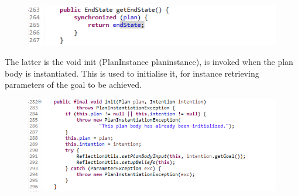 \documentclass{article}
\begin{document}

\begin{figure}[!ht]
	\centering
	\includegraphics[width=\linewidth]{GetEndState}
	\label{Rotulo}
\end{figure}

The latter is the void init (PlanInstance planinstance), is invoked when the plan body is instantiated. This is used to initialise it, for instance retrieving parameters of the goal to be achieved.

\begin{figure}[!ht]
	\centering
	\includegraphics[width=\linewidth]{voidInit}
	\label{fig:voidInit}
\end{figure}

\end{document}

